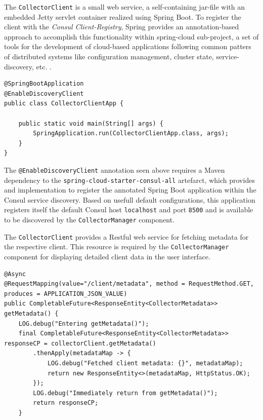The \verb|CollectorClient| is a small web service, a self-containing jar-file with an embedded Jetty servlet container realized using
Spring Boot. To register the client with the \textit{Consul Client-Registry}, Spring provides an annotation-based approach to accomplish
this functionality within spring-cloud sub-project, a set of tools for the development of cloud-based applications following common patters
of distributed systems like configuration management, cluster state, service-discovery, etc. .

\begin{lstlisting}[caption={"CollectorClientApp", Client registration}, captionpos=b, label={lst:collector-client-registration}]
@SpringBootApplication
@EnableDiscoveryClient
public class CollectorClientApp {

    public static void main(String[] args) {
        SpringApplication.run(CollectorClientApp.class, args);
    }
}
\end{lstlisting}

The \verb|@EnableDiscoveryClient| annotation seen above requires a Maven dependency to the \verb|spring-cloud-starter-consul-all| artefarct,
which provides and implementation to register the annotated Spring Boot application within the Consul service discovery. Based
on usefull default configurations, this application registers itself the default Consul host \verb|localhost| and port \verb|8500| and is
available to be discovered by the \verb|CollectorManager| component.

The \verb|CollectorClient| provides a Restful web service for fetching metadata for the respective client. This resource is required by
the \verb|CollectorManager| component for displaying detailed client data in the user interface.

\begin{lstlisting}[caption={"ClientMetadataController", Metadata REST endpoint}, captionpos=b, label={lst:metadata-endpoint}]
@Async
@RequestMapping(value="/client/metadata", method = RequestMethod.GET, produces = APPLICATION_JSON_VALUE)
public CompletableFuture<ResponseEntity<CollectorMetadata>> getMetadata() {
    LOG.debug("Entering getMetadata()");
    final CompletableFuture<ResponseEntity<CollectorMetadata>> responseCP = collectorClient.getMetadata()
        .thenApply(metadataMap -> {
            LOG.debug("Fetched client metadata: {}", metadataMap);
            return new ResponseEntity<>(metadataMap, HttpStatus.OK);
        });
        LOG.debug("Immediately return from getMetadata()");
        return responseCP;
    }
\end{lstlisting}

